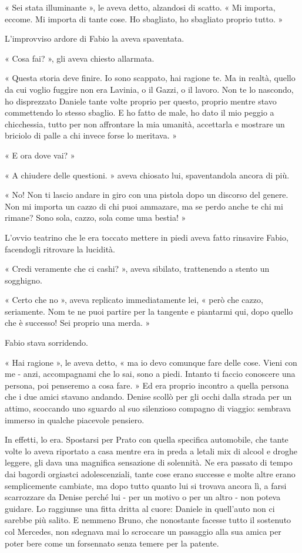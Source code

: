 « Sei stata illuminante », le aveva detto, alzandosi di scatto. « Mi importa, eccome. Mi importa di tante cose. Ho sbagliato, ho sbagliato proprio tutto. »

L'improvviso ardore di Fabio la aveva spaventata.

« Cosa fai? », gli aveva chiesto allarmata.

« Questa storia deve finire. Io sono scappato, hai ragione te. Ma in realtà, quello da cui voglio fuggire non era Lavinia, o il Gazzi, o il lavoro. Non te lo nascondo, ho disprezzato Daniele tante volte proprio per questo, proprio mentre stavo commettendo lo stesso sbaglio. E ho fatto de male, ho dato il mio peggio a chicchessia, tutto per non affrontare la mia umanità, accettarla e mostrare un briciolo di palle a chi invece forse lo meritava. »

« E ora dove vai? »

« A chiudere delle questioni. » aveva chiosato lui, spaventandola ancora di più.

« No! Non ti lascio andare in giro con una pistola dopo un discorso del genere. Non mi importa un cazzo di chi puoi ammazare, ma se perdo anche te chi mi rimane? Sono sola, cazzo, sola come uma bestia! »

L’ovvio teatrino che le era toccato mettere in piedi aveva fatto rinsavire Fabio, facendogli ritrovare la lucidità.

« Credi veramente che ci cashi? », aveva sibilato, trattenendo a stento un sogghigno.

« Certo che no », aveva replicato immediatamente lei, « però che cazzo, seriamente. Nom te ne puoi partire per la tangente e piantarmi qui, dopo quello che è successo! Sei proprio una merda. »

Fabio stava sorridendo. 

« Hai ragione », le aveva detto, « ma io devo comunque fare delle cose. Vieni con me - anzi, accompagnami che lo sai, sono a piedi. Intanto ti faccio conoscere una persona, poi penseremo a cosa fare. »
​
Ed era proprio incontro a quella persona che i due amici stavano andando. Denise scollò per gli occhi dalla strada per un attimo, scoccando uno sguardo al suo silenzioso compagno di viaggio: sembrava immerso in qualche piacevole pensiero.

In effetti, lo era. Spostarsi per Prato con quella specifica automobile, che tante volte lo aveva riportato a casa mentre era in preda a letali mix di alcool e droghe leggere, gli dava una magnifica sensazione di solennità. Ne era passato di tempo dai bagordi orgiastci adolescenziali, tante cose erano successe e molte altre erano semplicemente cambiate, ma dopo tutto quanto lui si trovava ancora lì, a farsi scarrozzare da Denise perché lui - per un motivo o per un altro - non poteva guidare. Lo raggiunse una fitta dritta al cuore: Daniele in quell'auto non ci sarebbe più salito. E nemmeno Bruno, che nonostante facesse tutto il sostenuto col Mercedes, non sdegnava mai lo scroccare un passaggio alla sua amica per poter bere come un forsennato senza temere per la patente.

